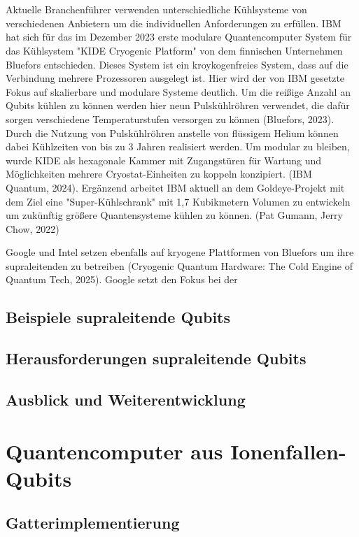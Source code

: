 \\\\
Aktuelle Branchenführer verwenden unterschiedliche Kühlsysteme von verschiedenen Anbietern um die individuellen Anforderungen zu erfüllen. IBM hat sich für das im Dezember 2023 erste modulare Quantencomputer System für das Kühlsystem "KIDE Cryogenic Platform" von dem finnischen Unternehmen Bluefors entschieden. Dieses System ist ein kroykogenfreies System, dass auf die Verbindung mehrere Prozessoren ausgelegt ist. Hier wird der von IBM gesetzte Fokus auf skalierbare und modulare Systeme deutlich. Um die reißige Anzahl an Qubits kühlen zu können werden hier neun Pulskühlröhren verwendet, die dafür sorgen verschiedene Temperaturstufen versorgen zu können (Bluefors, 2023). Durch die Nutzung von Pulskühlröhren anstelle von flüssigem Helium können dabei Kühlzeiten von bis zu 3 Jahren realisiert werden. Um modular zu bleiben, wurde KIDE als hexagonale Kammer mit Zugangstüren für Wartung und Möglichkeiten mehrere Cryostat-Einheiten zu koppeln konzipiert. (IBM Quantum, 2024). Ergänzend arbeitet IBM aktuell an dem Goldeye-Projekt mit dem Ziel eine "Super-Kühlschrank" mit 1,7 Kubikmetern Volumen zu entwickeln um zukünftig größere Quantensysteme kühlen zu können. (Pat Gumann, Jerry Chow, 2022) 

Google und Intel setzen ebenfalls auf kryogene Plattformen von Bluefors um ihre supraleitenden zu betreiben (Cryogenic Quantum Hardware: The Cold Engine of Quantum Tech, 2025). Google setzt den Fokus bei der 


\subsection{Beispiele supraleitende Qubits}
\subsection{Herausforderungen supraleitende Qubits}
\subsection{Ausblick und Weiterentwicklung}

\section{Quantencomputer aus Ionenfallen-Qubits}
\subsection{Gatterimplementierung}


